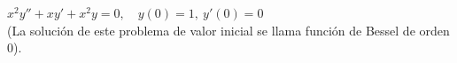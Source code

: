 \item $x^2y'' + xy' + x^2y = 0, \quad y(0) = 1, \ y'(0) = 0$ \\
    (La solución de este problema de valor inicial se llama función de Bessel de orden 0).
